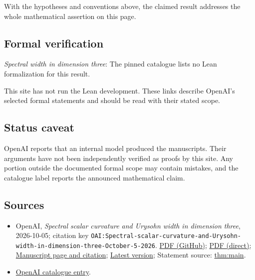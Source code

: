 \documentclass[11pt]{article}
\begin{document}
With the hypotheses and conventions above, the claimed result addresses the whole mathematical assertion on this page.

\subsection{Formal verification}
\textit{Spectral width in dimension three}: The pinned catalogue lists no Lean formalization for this result.

This site has not run the Lean development. These links describe OpenAI’s selected formal statements and should be read with their stated scope.

\subsection{Status caveat}
OpenAI reports that an internal model produced the manuscripts. Their arguments have not been independently verified as proofs by this site. Any portion outside the documented formal scope may contain mistakes, and the catalogue label reports the announced mathematical claim.

\subsection{Sources}
\begin{itemize}
\item OpenAI, \emph{Spectral scalar curvature and Urysohn width in dimension three}, 2026-10-05; citation key \texttt{OAI:Spectral-scalar-curvature-and-Urysohn-width-in-dimension-three-October-5-2026}. \href{https://github.com/openai/math/blob/adc7f1241b42e322a6451854ab7e4b4c146bf78a/preprints/Spectral-scalar-curvature-and-Urysohn-width-in-dimension-three-October-5-2026/spectral-urysohn-three-manifolds.pdf}{PDF (GitHub)}; \href{https://github.com/openai/math/raw/adc7f1241b42e322a6451854ab7e4b4c146bf78a/preprints/Spectral-scalar-curvature-and-Urysohn-width-in-dimension-three-October-5-2026/spectral-urysohn-three-manifolds.pdf}{PDF (direct)}; \href{https://github.com/openai/math/blob/adc7f1241b42e322a6451854ab7e4b4c146bf78a/preprints/Spectral-scalar-curvature-and-Urysohn-width-in-dimension-three-October-5-2026/README.md}{Manuscript page and citation}; \href{https://github.com/openai/math/blob/main/preprints/Spectral-scalar-curvature-and-Urysohn-width-in-dimension-three-October-5-2026/spectral-urysohn-three-manifolds.pdf}{Latest version}; Statement source: \href{https://github.com/openai/math/blob/adc7f1241b42e322a6451854ab7e4b4c146bf78a/preprints/Spectral-scalar-curvature-and-Urysohn-width-in-dimension-three-October-5-2026/build/sections/01-introduction.tex\#L32}{thm:main}.
\item \href{https://github.com/openai/math/blob/adc7f1241b42e322a6451854ab7e4b4c146bf78a/CONTENTS.md}{OpenAI catalogue entry}.
\end{itemize}
\end{document}
